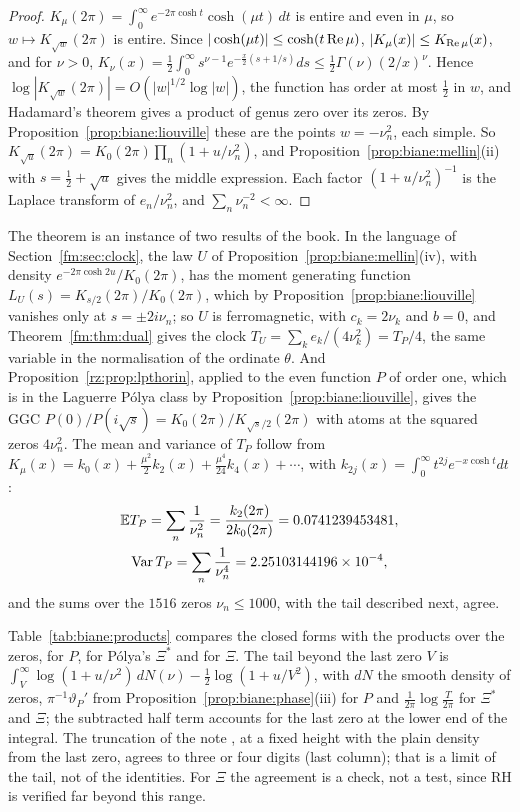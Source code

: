 \begin{proof}
$K_\mu(2\pi)=\int_0^\infty e^{-2\pi\cosh t}\cosh(\mu t)\,dt$ is entire and even in $\mu$, so $w\mapsto K_{\sqrt w}(2\pi)$ is entire. Since $|\cosh(\mu t)|\le\cosh(t\operatorname{Re}\mu)$, $|K_\mu(x)|\le K_{\operatorname{Re}\mu}(x)$, and for $\nu>0$, $K_\nu(x)=\frac12\int_0^\infty s^{\nu-1}e^{-\frac x2(s+1/s)}ds\le\frac12\Gamma(\nu)(2/x)^\nu$. Hence $\log|K_{\sqrt w}(2\pi)|=O(|w|^{1/2}\log|w|)$, the function has order at most $\frac12$ in $w$, and Hadamard's theorem gives a product of genus zero over its zeros. By Proposition~\ref{prop:biane:liouville} these are the points $w=-\nu_n^2$, each simple. So $K_{\sqrt u}(2\pi)=K_0(2\pi)\prod_n(1+u/\nu_n^2)$, and Proposition~\ref{prop:biane:mellin}(ii) with $s=\frac12+\sqrt u$ gives the middle expression. Each factor $(1+u/\nu_n^2)^{-1}$ is the Laplace transform of $e_n/\nu_n^2$, and $\sum_n\nu_n^{-2}<\infty$.
\end{proof}

The theorem is an instance of two results of the book. In the language of Section~\ref{fm:sec:clock}, the law $U$ of Proposition~\ref{prop:biane:mellin}(iv), with density $e^{-2\pi\cosh2u}/K_0(2\pi)$, has the moment generating function $L_U(s)=K_{s/2}(2\pi)/K_0(2\pi)$, which by Proposition~\ref{prop:biane:liouville} vanishes only at $s=\pm2i\nu_n$; so $U$ is ferromagnetic, with $c_k=2\nu_k$ and $b=0$, and Theorem~\ref{fm:thm:dual} gives the clock $T_U=\sum_ke_k/(4\nu_k^2)=T_P/4$, the same variable in the normalisation of the ordinate $\theta$. And Proposition~\ref{rz:prop:lpthorin}, applied to the even function $P$ of order one, which is in the Laguerre P\'olya class by Proposition~\ref{prop:biane:liouville}, gives the GGC $P(0)/P(i\sqrt s)=K_0(2\pi)/K_{\sqrt s/2}(2\pi)$ with atoms at the squared zeros $4\nu_n^2$. The mean and variance of $T_P$ follow from $K_\mu(x)=k_0(x)+\frac{\mu^2}2k_2(x)+\frac{\mu^4}{24}k_4(x)+\cdots$, with $k_{2j}(x)=\int_0^\infty t^{2j}e^{-x\cosh t}dt$:
\begin{gather*}
\mathbb{E} T_P=\sum_n\frac1{\nu_n^2}=\frac{k_2(2\pi)}{2k_0(2\pi)}=0.0741239453481,\\
\operatorname{Var}T_P=\sum_n\frac1{\nu_n^4}=2.25103144196\times10^{-4},
\end{gather*}
and the sums over the $1516$ zeros $\nu_n\le1000$, with the tail described next, agree.

Table~\ref{tab:biane:products} compares the closed forms with the products over the zeros, for $P$, for P\'olya's $\Xi^*$ and for $\Xi$. The tail beyond the last zero $V$ is $\int_V^\infty\log(1+u/\nu^2)\,dN(\nu)-\frac12\log(1+u/V^2)$, with $dN$ the smooth density of zeros, $\pi^{-1}\vartheta_P'$ from Proposition~\ref{prop:biane:phase}(iii) for $P$ and $\frac1{2\pi}\log\frac T{2\pi}$ for $\Xi^*$ and $\Xi$; the subtracted half term accounts for the last zero at the lower end of the integral. The truncation of the note \cite{P26bia}, at a fixed height with the plain density from the last zero, agrees to three or four digits (last column); that is a limit of the tail, not of the identities. For $\Xi$ the agreement is a check, not a test, since RH is verified far beyond this range.

